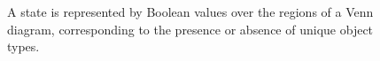 \documentclass[floatsintext, doc]{apa6}
\def\firstcircle{(90:1cm) circle (1.5cm)}
\def\secondcircle{(210:1cm) circle (1.5cm)}
\def\thirdcircle{(330:1cm) circle (1.5cm)}
\begin{document}
\begin{figure}[h]
\centering
\label{fig:venn}
\caption{A state is represented by Boolean values over the regions of a Venn diagram, corresponding to the presence or absence of unique object types.}
\end{figure}
\end{document}
